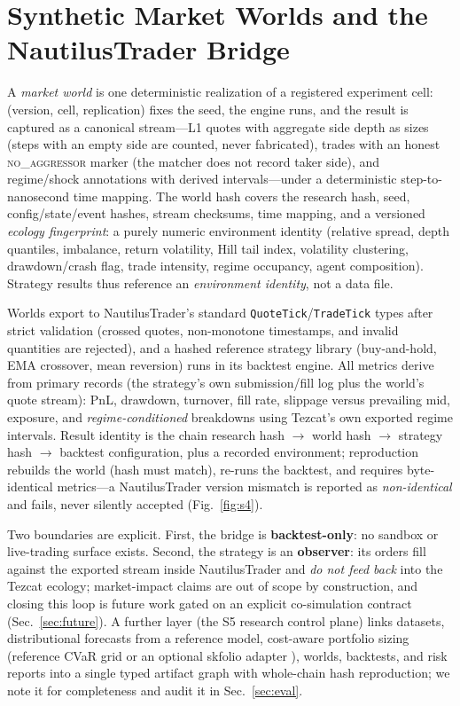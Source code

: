 \documentclass[conference]{IEEEtran}
\newcommand{\tez}{Tezcat}
\begin{document}
\section{Synthetic Market Worlds and the NautilusTrader Bridge}
\label{sec:lab}
A \emph{market world} is one deterministic realization of a registered
experiment cell: (version, cell, replication) fixes the seed, the
engine runs, and the result is captured as a canonical stream---L1
quotes with aggregate side depth as sizes (steps with an empty side are
counted, never fabricated), trades with an honest
\textsc{no\_aggressor} marker (the matcher does not record taker side),
and regime/shock annotations with derived intervals---under a
deterministic step-to-nanosecond time mapping. The world hash covers
the research hash, seed, config/state/event hashes, stream checksums,
time mapping, and a versioned \emph{ecology fingerprint}: a purely
numeric environment identity (relative spread, depth quantiles,
imbalance, return volatility, Hill tail index, volatility clustering,
drawdown/crash flag, trade intensity, regime occupancy, agent
composition). Strategy results thus reference an \emph{environment
identity}, not a data file.

Worlds export to NautilusTrader's \cite{nautilustrader} standard
\texttt{QuoteTick}/\texttt{TradeTick} types after strict validation
(crossed quotes, non-monotone timestamps, and invalid quantities are
rejected), and a hashed reference strategy library (buy-and-hold, EMA
crossover, mean reversion) runs in its backtest engine. All metrics
derive from primary records (the strategy's own submission/fill log
plus the world's quote stream): PnL, drawdown, turnover, fill rate,
slippage versus prevailing mid, exposure, and \emph{regime-conditioned}
breakdowns using \tez{}'s own exported regime intervals. Result
identity is the chain research hash $\rightarrow$ world hash
$\rightarrow$ strategy hash $\rightarrow$ backtest configuration, plus
a recorded environment; reproduction rebuilds the world (hash must
match), re-runs the backtest, and requires byte-identical metrics---a
NautilusTrader version mismatch is reported as \emph{non-identical}
and fails, never silently accepted (Fig.~\ref{fig:s4}).

Two boundaries are explicit. First, the bridge is
\textbf{backtest-only}: no sandbox or live-trading surface exists.
Second, the strategy is an \textbf{observer}: its orders fill against
the exported stream inside NautilusTrader and \emph{do not feed back}
into the \tez{} ecology; market-impact claims are out of scope by
construction, and closing this loop is future work gated on an
explicit co-simulation contract (Sec.~\ref{sec:future}). A further
layer (the S5 research control plane) links datasets, distributional
forecasts from a reference model, cost-aware portfolio sizing
(reference CVaR grid or an optional skfolio adapter \cite{skfolio}),
worlds, backtests, and risk reports into a single typed artifact graph
with whole-chain hash reproduction; we note it for completeness and
audit it in Sec.~\ref{sec:eval}.
\end{document}
